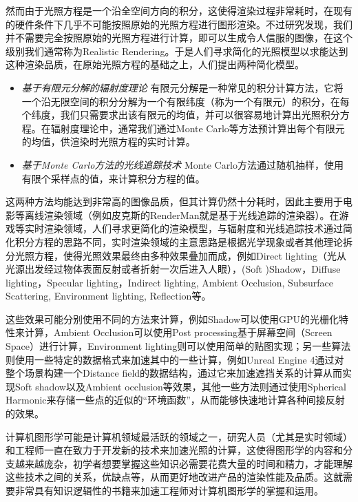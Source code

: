 然而由于光照方程是一个沿全空间方向的积分，这使得渲染过程非常耗时，在现有的硬件条件下几乎不可能按照原始的光照方程进行图形渲染。不过研究发现，我们并不需要完全按照原始的光照方程进行计算，即可以生成令人信服的图像，在这个级别我们通常称为Realistic Rendering。于是人们寻求简化的光照模型以求能达到这种渲染品质，在原始光照方程的基础之上，人们提出两种简化模型。

\begin{itemize}
	\item \emph{基于有限元分解的辐射度理论 } 有限元分解是一种常见的积分计算方法，它将一个沿无限空间的积分分解为一个有限纬度（称为一个有限元）的积分，在每个纬度，我们只需要求出该有限元的均值，并可以很容易地计算出光照积分方程。在辐射度理论中，通常我们通过Monte Carlo等方法预计算出每个有限元的均值，供渲染时光照方程的实时计算。
	\item \emph{基于Monte Carlo方法的光线追踪技术 } Monte Carlo方法通过随机抽样，使用有限个采样点的值，来计算积分方程的值。
\end{itemize}

这两种方法均能达到非常高的图像品质，但其计算仍然十分耗时，因此主要用于电影等离线渲染领域（例如皮克斯的RenderMan就是基于光线追踪的渲染器）。在游戏等实时渲染领域，人们寻求更简化的渲染模型，与辐射度和光线追踪技术通过简化积分方程的思路不同，实时渲染领域的主意思路是根据光学现象或者其他理论拆分光照方程，使得光照效果最终由多种效果叠加而成，例如Direct lighting（光从光源出发经过物体表面反射或者折射一次后进入人眼），(Soft )Shadow，Diffuse lighting，Specular lighting，Indirect lighting, Ambient Occlusion, Subsurface Scattering, Environment lighting, Reflection等。

这些效果可能分别使用不同的方法来计算，例如Shadow可以使用GPU的光栅化特性来计算，Ambient Occlusion可以使用Post processing基于屏幕空间（Screen Space）进行计算，Environment lighting则可以使用简单的贴图实现；另一些算法则使用一些特定的数据格式来加速其中的一些计算，例如Unreal Engine 4通过对整个场景构建一个Distance field的数据结构，通过它来加速遮挡关系的计算从而实现Soft shadow以及Ambient occlusion等效果，其他一些方法则通过使用Spherical Harmonic来存储一些点的近似的“环境函数”，从而能够快速地计算各种间接反射的效果。

计算机图形学可能是计算机领域最活跃的领域之一，研究人员（尤其是实时领域）和工程师一直在致力于开发新的技术来加速光照的计算，这使得图形学的内容和分支越来越庞杂，初学者想要掌握这些知识必需要花费大量的时间和精力，才能理解这些技术之间的关系，优缺点等，从而更好地改进产品的渲染性能及品质。这就需要非常具有知识逻辑性的书籍来加速工程师对计算机图形学的掌握和运用。

